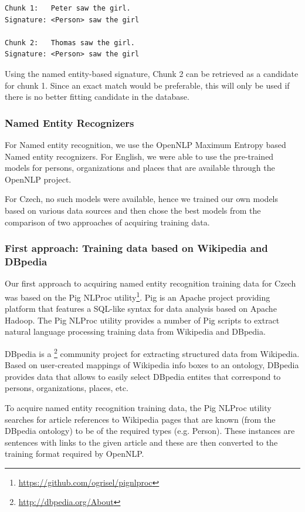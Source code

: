 \begin{lstlisting}
Chunk 1:   Peter saw the girl.
Signature: <Person> saw the girl

Chunk 2:   Thomas saw the girl.
Signature: <Person> saw the girl
\end{lstlisting}

Using the named entity-based signature, Chunk 2 can be retrieved as a
candidate for chunk 1. Since an exact match would be preferable, this 
will only be used if there is no better fitting candidate in the
database.

\subsubsection{Named Entity Recognizers}

For Named entity recognition, we use the OpenNLP Maximum Entropy based
Named entity recognizers. For English, we were able to use the pre-trained
models for persons, organizations and places that are available through the
OpenNLP project.

For Czech, no such models were available, hence we trained our own models based
on various data sources and then chose the best models from the comparison 
of two approaches of acquiring training data.


\subsubsection*{First approach: Training data based on Wikipedia and DBpedia}

Our first approach to acquiring named entity recognition training data for Czech 
was based on the Pig NLProc utility\footnote{\url{https://github.com/ogrisel/pignlproc}}.
Pig is an Apache project providing platform that features a SQL-like syntax
for data analysis based on Apache Hadoop. The Pig NLProc utility provides a number
of Pig scripts to extract natural language processing training data from Wikipedia
and DBpedia.

DBpedia is a \footnote{\url{http://dbpedia.org/About}} community project for extracting 
structured data from Wikipedia. Based on user-created mappings of Wikipedia info boxes to
an ontology, DBpedia provides data that allows to easily select DBpedia entites that 
correspond to persons, organizations, places, etc.

To acquire named entity recognition training data, the Pig NLProc utility searches
for article references to Wikipedia pages that are known (from the DBpedia ontology)
to be of the required types (e.g. Person). These instances are sentences with links
to the given article and these are then converted to the training format required 
by OpenNLP.

